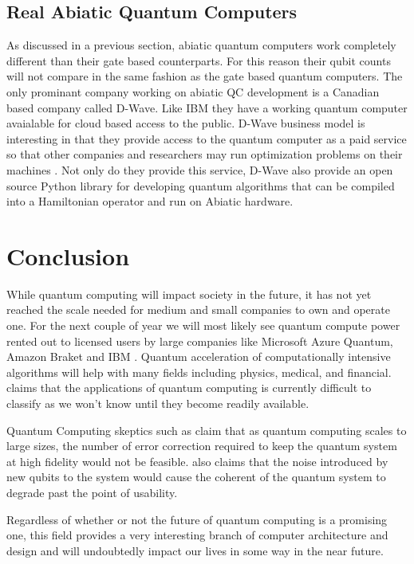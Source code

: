 \documentclass[conference]{IEEEtran}
\begin{document}
\subsection{Real Abiatic Quantum Computers}

As discussed in a previous section, abiatic quantum computers work completely different than their gate based counterparts. For this reason their qubit counts will not compare in the same fashion as the gate based quantum computers. The only prominant company working on abiatic QC development is a Canadian based company called D-Wave. Like IBM they have a working quantum computer avaialable for cloud based access to the public. D-Wave business model is interesting in that they provide access to the quantum computer as a paid service so that other companies and researchers may run optimization problems on their machines \cite{b13}. Not only do they provide this service, D-Wave also provide an open source Python library for developing quantum algorithms that can be compiled into a Hamiltonian operator and run on Abiatic hardware.

\section{Conclusion}

While quantum computing will impact society in the future, it has not yet reached the scale needed for medium and small companies to own and operate one. For the next couple of year we will most likely see quantum compute power rented out to licensed users by large companies like Microsoft Azure Quantum, Amazon Braket and IBM  \cite{b1}. Quantum acceleration of computationally intensive algorithms will help with many fields including physics, medical, and financial. \cite{b2} claims that the applications of quantum computing is currently difficult to classify as we won't know until they become readily available.

Quantum Computing skeptics such as \cite{b16} claim that as quantum computing scales to large sizes, the number of error correction required to keep the quantum system at high fidelity would not be feasible. \cite{b16} also claims that the noise introduced by new qubits to the system would cause the coherent of the quantum system to degrade past the point of usability.

Regardless of whether or not the future of quantum computing is a promising one, this field provides a very interesting branch of computer architecture and design and will undoubtedly impact our lives in some way in the near future.
\end{document}
